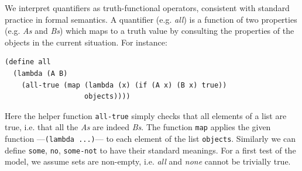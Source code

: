 \documentclass[10pt,letterpaper]{article}
\begin{document}
%



%
%




We interpret quantifiers as truth-functional operators, consistent with standard practice in formal semantics.
A quantifier (e.g. \emph{all}) is a function of two properties (e.g. \emph{As} and \emph{Bs}) which maps to a truth value by consulting the properties of the objects in the current situation. For instance:
\begin{lstlisting}
(define all 
  (lambda (A B) 
    (all-true (map (lambda (x) (if (A x) (B x) true)) 
                   objects))))
\end{lstlisting}
Here the helper function \lstinline{all-true} simply checks that all elements of a list are true, i.e. that all the \emph{As} are indeed \emph{Bs}. The function \lstinline{map} applies the given function ---\lstinline{(lambda ...)}--- to each element of the list \lstinline{objects}. Similarly we can define \lstinline{some}, \lstinline{no}, \lstinline{some-not} to have their standard meanings. For a first test of the model, we assume sets are non-empty, i.e. \emph{all} and \emph{none} cannot be trivially true.
\end{document}
